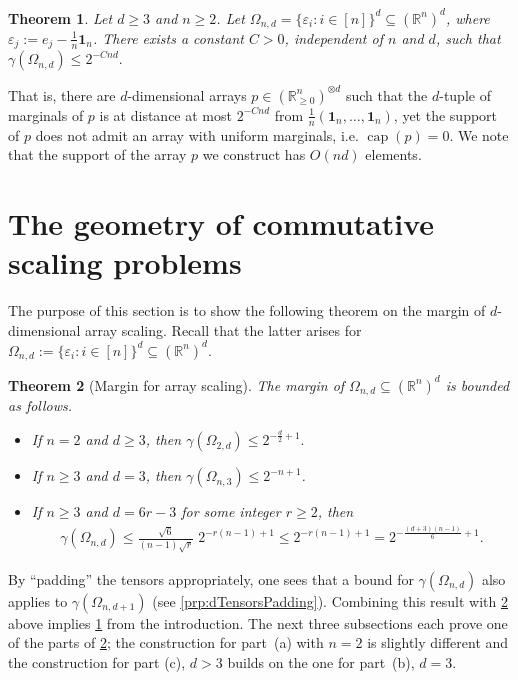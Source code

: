\documentclass[10pt,a4paper]{article}
\newtheorem{thm}{Theorem}[section]\crefname{thm}{Theorem}{Theorems}
\numberwithin{equation}{section}
\DeclareMathOperator{\capa}{cap}
\newcommand{\RR}{\mathbb R}
\newcommand{\ot}{\otimes}
\newcommand{\eps}{\varepsilon}
\newcommand{\id}{\mathbf{1}}
\begin{document}
\begin{thm}\label{thm:tensor-margin} Let $d \geq 3$ and $n \geq 2$. Let $\Omega_{n,d} = \{\eps_{i}: i \in [n]\}^d \subseteq (\RR^n)^d$, where $\eps_j:=e_j - \frac{1}{n} \id_n$. There exists a constant $C>0$, independent of $n$ and $d$, such that
$\gamma(\Omega_{n,d}) \leq 2^{-Cnd}.$ 
\end{thm}

That is, there are $d$-dimensional arrays $p \in (\RR^n_{\geq 0})^{\ot d}$ such that the $d$-tuple of marginals of $p$ is at distance at most $2^{ - Cnd}$ from $\frac{1}{n}(\id_n, \dots, \id_n)$, yet the support of $p$ does not admit an array with uniform marginals, i.e. $\capa(p) = 0$. We note that the support of the array $p$ we construct has $O(nd)$ elements.

\section{The geometry of commutative scaling problems}\label{sec:MarginComm}

The purpose of this section is to show the following theorem on the margin of $d$-dimensional array scaling. Recall that the latter arises for $\Omega_{n,d} := \{\eps_i: i \in [n]\}^d \subseteq (\RR^n)^d$.

\begin{thm}[Margin for array scaling]\label{thm:MarginTensor}
The margin of $\Omega_{n,d} \subseteq (\RR^n)^d$ is bounded as follows.
	\begin{itemize}
	\item[(a)] If $n=2$ and $d \geq 3$, then
	$
	\gamma \left(\Omega_{2,d} \right)  \leq  2^{-\frac{d}{2} + 1}.
	$
	\item[(b)] If $n \geq 3$ and $d = 3$, then $\gamma(\Omega_{n,3}) \leq 2^{-n+1}$.
	\item[(c)] If $n \geq 3$ and $d = 6 r - 3$ for some integer $r \geq 2$, then
		\begin{align*}
		\gamma(\Omega_{n,d})  \leq \frac{\sqrt{6}}{(n-1)\sqrt{r}} \; 2^{-r(n-1) + 1} 
		\leq 2^{- r (n-1) + 1} = 2^{- \frac{(d+3)(n-1)}{6} + 1}.
		\end{align*}
		\end{itemize}
\end{thm}
By ``padding'' the tensors appropriately, one sees that a bound for $\gamma(\Omega_{n,d})$ also applies to $\gamma(\Omega_{n,d+1})$ (see  \cref{prp:dTensorsPadding}). Combining this result with \cref{thm:MarginTensor} above implies \cref{thm:tensor-margin} from the introduction. The next three subsections each prove one of the parts of \cref{thm:MarginTensor}; the construction for part~(a) with $n = 2$ is slightly different and the construction for part (c), $d > 3$ builds on the one for part~(b), $d = 3$.
\end{document}
